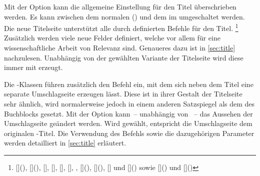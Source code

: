 \begin{Declaration*}{}
\begin{Declaration*}{}
\begin{Declaration*}{}
\begin{Declaration}[%
  v2.03!\Option{cdtitle=bicolor}:%
    Farbeinsatz nur im Kopf mit farbig abgesetztem Querbalken;
  v2.03!\Option{cdtitle=fullcolor}:%
    voller Farbeinsatz mit farbig abgesetztem Querbalken;
  v2.04!\Option{cdtitle=barcolor}:nur farbig abgesetzter Querbalken;%
]{}
\printdeclarationlist%
%
%
Mit der Option  kann die allgemeine Einstellung für den Titel 
überschrieben werden. Es kann zwischen dem normalen () 
und dem im \CD umgeschaltet werden. Die neue Titelseite unterstützt alle durch 
\KOMAScript{} definierten Befehle für den Titel.%
\footnote{%
  [](),
  [](),
  [], [],
  [], [],
  , [](), 
  [](),
  [] und   
  []() sowie
  []()
  und
  []()%
}
Zusätzlich werden viele neue Felder definiert, welche vor allem für eine 
wissenschaftliche Arbeit von Relevanz sind. Genaueres dazu 
ist in \autoref{sec:title} nachzulesen. Unabhängig von der gewählten Variante 
der Titelseite wird diese immer mit  erzeugt.
\end{Declaration}

\begin{Declaration}[%
  v2.02;%
  v2.03!\Option{cdcover=bicolor}:%
    Farbeinsatz nur im Kopf mit farbig abgesetztem Querbalken;
  v2.03!\Option{cdcover=fullcolor}:%
    voller Farbeinsatz mit farbig abgesetztem Querbalken;
  v2.04!\Option{cdcover=barcolor}:nur farbig abgesetzter Querbalken;%
]{}
\printdeclarationlist%
%
%
Die \TUDScript-Klassen führen zusätzlich den Befehl  ein, mit 
dem sich neben dem Titel eine separate Umschlagseite erzeugen lässt. Diese ist 
in ihrer Gestalt der Titelseite sehr ähnlich, wird normalerweise jedoch in 
einem anderen Satzspiegel als dem des Buchblocks gesetzt. Mit der Option 
 kann~-- unabhängig von ~-- das Aussehen der 
Umschlagseite geändert werden. Wird  gewählt, entspricht 
die Umschlagseite dem originalen \KOMAScript-Titel. Die Verwendung des Befehls 
 sowie die dazugehörigen Parameter werden detailliert in 
\autoref{sec:title} erläutert.
\end{Declaration}


\end{Declaration*}
\end{Declaration*}
\end{Declaration*}
